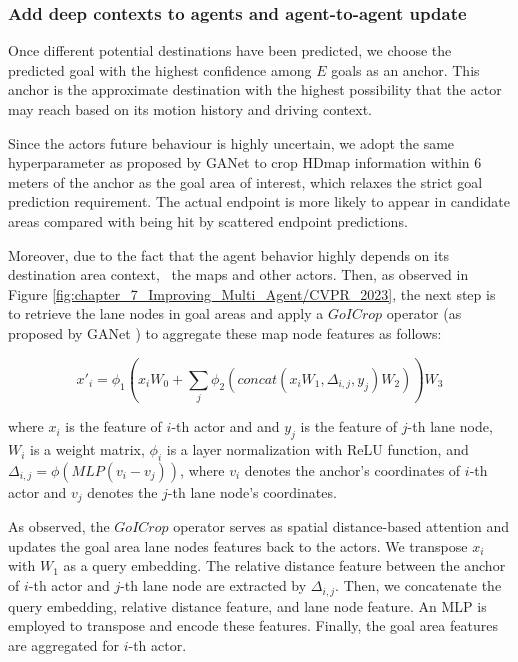 \subsubsection{Add deep contexts to agents and agent-to-agent update}
\label{subsubsec:7_improving_efficiency_add_deep_context}

Once different potential destinations have been predicted, we choose the predicted goal with the highest confidence among $E$ goals as an anchor. This anchor is the approximate destination with the highest possibility that the actor may reach based on its motion history and driving context.

Since the actors future behaviour is highly uncertain, we adopt the same hyperparameter as proposed by GANet \cite{wang2022ganet} to crop \ac{HDmap} information within 6 meters of the anchor as the goal area of interest, which relaxes the strict goal prediction requirement. The actual endpoint is more likely to appear in candidate areas compared with being hit by scattered endpoint predictions.

Moreover, due to the fact that the agent behavior highly depends on its destination area context, \ie \ the maps and other actors. Then, as observed in Figure \ref{fig:chapter_7_Improving_Multi_Agent/CVPR_2023}, the next step is to retrieve the lane nodes in goal areas and apply a $GoICrop$ operator (as proposed by GANet \cite{wang2022ganet}) to aggregate these map node features as follows:

\begin{equation}
	x'_i = \phi_1(x_iW_0+\sum_j\phi_2(concat(x_iW_1,\Delta_{i,j},y_j)W_2))W_3
	\label{att}
\end{equation}

where $x_i$ is the feature of $i$-th actor and and $y_j$ is the feature of $j$-th lane node, $W_i$ is a weight matrix, $\phi_i$ is a layer normalization with \ac{ReLU} function, and $\Delta_{i,j}=\phi(MLP(v_i-v_j))$, where $v_i$ denotes the anchor's coordinates of $i$-th actor and $v_j$ denotes the $j$-th lane node's coordinates.
 
As observed, the $GoICrop$ operator serves as spatial distance-based attention and updates the goal area lane nodes features back to the actors. We transpose $x_i$ with $W_1$ as a query embedding. The relative distance feature between the anchor of $i$-th actor and $j$-th lane node are extracted by $\Delta_{i,j}$. Then, we concatenate the query embedding, relative distance feature, and lane node feature. An \ac{MLP} is employed to transpose and encode these features. Finally, the goal area features are aggregated for $i$-th actor.

